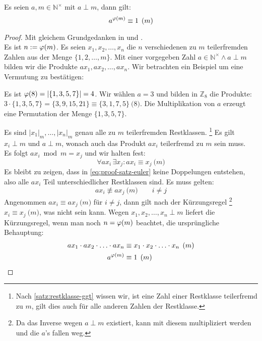 \begin{satz}
  Es seien $a,m \in \mathbb{N}^\times$ mit $a \perp m$, dann gilt:
  \begin{equation*}
    a^{\varphi(m)} \equiv 1 \pod{m}
  \end{equation*}
\end{satz}
\begin{proof}
  Mit gleichem Grundgedanken in \parencite{SITE:phi-euler-fermat} und
  \parencite[187-188]{BOOK:numberTheory}. \\
  Es ist $n := \varphi(m)$. Es seien $x_1,x_2,\ldots,x_n$ die $n$ verschiedenen zu
  $m$ teilerfremden Zahlen aus der Menge $\{1,2,\ldots,m\}$.
  Mit einer vorgegeben Zahl
  $a \in \mathbb{N}^\times \wedge a \perp m$ bilden wir die Produkte $ax_1,ax_2,\ldots,ax_n$.
  Wir betrachten ein Beispiel um eine Vermutung zu bestätigen:
  \begin{example}
    Es ist $\varphi(8) = |\{1,3,5,7\}| = 4$. Wir wählen $a = 3$ und bilden in $\mathbb{Z}_8$ die Produkte:
    $3\cdot \{1,3,5,7\} = \{3,9,15,21\} \equiv \{3,1,7,5\} \pod{8}$. Die Multiplikation von $a$ erzeugt eine
    Permutation der Menge $\{1,3,5,7\}$.
  \end{example}
  \noindent
  Es sind $|x_1|_m,\ldots,|x_n|_m$ genau alle zu $m$ teilerfremden Restklassen.
  \footnote{
    Nach \autoref{satz:restklasse-ggt} wissen wir, ist eine Zahl einer Restklasse teilerfremd zu $m$,
    gilt dies auch für alle anderen Zahlen der Restklasse.
  }
  Es gilt $x_i \perp m$ und $a \perp m$, wonach auch das Produkt $ax_i$ teilerfremd zu $m$ sein muss.\\
  Es folgt $ax_i \bmod{m} = x_j$ und wir halten fest:
  \begin{equation*}
    \label{eq:proof-satz-euler}
    \forall ax_i \, \exists x_j: ax_i \equiv x_j \pod{m} \tag{$*$}
  \end{equation*}
  Es bleibt zu zeigen, dass in \eqref{eq:proof-satz-euler} keine Doppelungen entstehen,
  also alle $ax_i$ Teil unterschiedlicher Restklassen sind. Es muss gelten:
  \begin{equation*}
    ax_i \not\equiv ax_j \pod{m} \qquad i \neq j
  \end{equation*}
  Angenommen $ax_i \equiv ax_j \pod{m}$ für $i \neq j$, dann gilt nach der Kürzungsregel
  \footnote{
    Da das Inverse wegen $a \perp m$ existiert, kann mit diesem multipliziert werden und die $a$'s
    fallen weg.
  }
  $x_i \equiv x_j \pod{m}$, was nicht sein kann.
  Wegen $x_1,x_2,\ldots,x_n \perp m$ liefert die Kürzungsregel, wenn man noch
  $n = \varphi(m)$ beachtet, die ursprüngliche Behauptung:
  \begin{align*}
    ax_1 \cdot ax_2 \cdot \ldots \cdot ax_n & \equiv
    x_1 \cdot x_2 \cdot \ldots \cdot x_n  \pod{m}                       \\
    a^{\varphi(m)}                            & \equiv 1 \pod{m} \qedhere
  \end{align*}
\end{proof}


